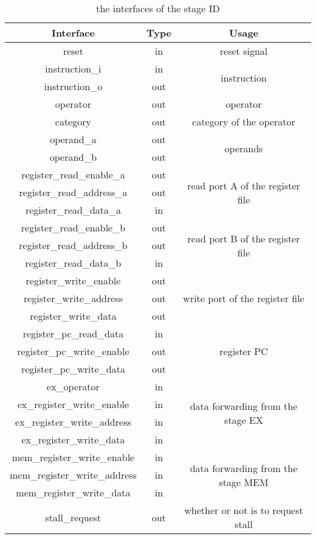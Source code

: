 \begin{table}[!h]
\centering
\begin{tabular}{ccc}
\toprule
Interface & Type & Usage \\ \midrule
reset & in & reset signal \\ \hline
instruction\_i & in & \multirow{2}{*}{instruction} \\ \cline{1-2}
instruction\_o & out &  \\ \hline
operator & out & operator \\ \hline
category & out & category of the operator \\ \hline
operand\_a & out & \multirow{2}{*}{operands} \\ \cline{1-2}
operand\_b & out &  \\ \hline
register\_read\_enable\_a & out & \multirow{3}{*}{read port A of the register file} \\ \cline{1-2}
register\_read\_address\_a & out &  \\ \cline{1-2}
register\_read\_data\_a & in &  \\ \hline
register\_read\_enable\_b & out & \multirow{3}{*}{read port B of the register file} \\ \cline{1-2}
register\_read\_address\_b & out &  \\ \cline{1-2}
register\_read\_data\_b & in &  \\ \hline
register\_write\_enable & out & \multirow{3}{*}{write port of the register file} \\ \cline{1-2}
register\_write\_address & out &  \\ \cline{1-2}
register\_write\_data & out &  \\ \hline
register\_pc\_read\_data & in & \multirow{3}{*}{register PC} \\ \cline{1-2}
register\_pc\_write\_enable & out &  \\ \cline{1-2}
register\_pc\_write\_data & out &  \\ \hline
ex\_operator & in & \multirow{4}{*}{data forwarding from the stage EX} \\ \cline{1-2}
ex\_register\_write\_enable & in &  \\ \cline{1-2}
ex\_register\_write\_address & in &  \\ \cline{1-2}
ex\_register\_write\_data & in &  \\ \hline
mem\_register\_write\_enable & in & \multirow{3}{*}{data forwarding from the stage MEM} \\ \cline{1-2}
mem\_register\_write\_address & in &  \\ \cline{1-2}
mem\_register\_write\_data & in &  \\ \hline
stall\_request & out & whether or not is to request stall \\ \bottomrule
\end{tabular}
\caption{the interfaces of the stage ID}
\end{table}
